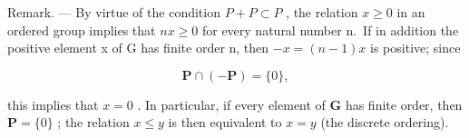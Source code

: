 Remark. --- By virtue of the condition \(P + P \subset P\) , the relation \(x \geqslant 0\) in an ordered group implies that \(nx \geqslant 0\) for every natural number n.~If in addition the positive element x of G has finite order n, then \(-x = (n - 1)x\) is positive; since

\[
\mathbf {P} \cap (- \mathbf {P}) = \{0 \},
\]

this implies that \(x = 0\) . In particular, if every element of \(\mathbf{G}\) has finite order, then \(\mathbf{P} = \{0\}\) ; the relation \(x \leqslant y\) is then equivalent to \(x = y\) (the discrete ordering).

